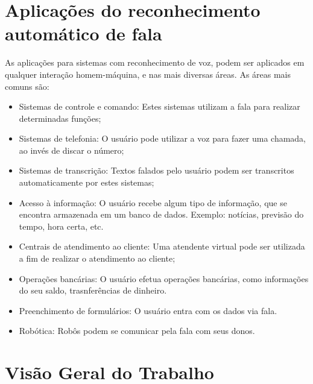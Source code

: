 \section{Aplicações do reconhecimento automático de fala}
As aplicações para sistemas com reconhecimento de voz, podem ser aplicados em qualquer interação homem-máquina, 
e nas mais diversas áreas. As áreas mais comuns são: \cite{AvaliaTecJose}

\begin{itemize}
\item Sistemas de controle e comando: Estes sistemas utilizam a fala para realizar
determinadas funções;
\item Sistemas de telefonia: O usuário pode utilizar a voz para fazer uma chamada, ao
invés de discar o número;
\item Sistemas de transcrição: Textos falados pelo usuário podem ser transcritos
automaticamente por estes sistemas;
\item Acesso à informação: O usuário recebe algum tipo de informação, que se encontra armazenada em um banco de dados. Exemplo: notícias, previsão do tempo, hora certa, etc.
\item Centrais de atendimento ao cliente: Uma atendente virtual pode ser utilizada a fim
de realizar o atendimento ao cliente;
\item Operações bancárias: O usuário efetua operações bancárias, como informações do seu saldo, trasnferências de dinheiro.
\item Preenchimento de formulários: O usuário entra com os dados via fala.
\item Robótica: Robôs podem se comunicar pela fala com seus donos.

\end{itemize}

\section{Visão Geral do Trabalho}









